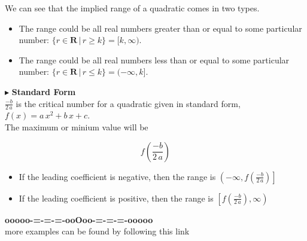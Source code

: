 \documentclass{ximera}
\begin{document}
We can see that the implied range of a quadratic comes in two types.  

\begin{itemize}
\item The range could be all real numbers greater than or equal to some particular number:  $\{ r \in \textbf{R} \, | \, r \geq k \} = [k, \infty)$.
\item The range could be all real numbers less than or equal to some particular number:  $\{ r \in \textbf{R} \, | \, r \leq k \} = (-\infty, k]$.
\end{itemize}






$\blacktriangleright$  \textbf{Standard Form} \\

$\frac{-b}{2 \, a}$ is the critical number for a quadratic given in standard form, $f(x) = a \, x^2 + b \, x + c$. \\

The maximum or minium value will be 

\[
f\left( \frac{-b}{2 \, a} \right)
\]

\begin{itemize}
     \item If the leading coefficient is negative, then the range is $\left(-\infty, f\left( \frac{-b}{2 \, a} \right)\right]$ \\
     \item If the leading coefficient is positive, then the range is $\left[f\left( \frac{-b}{2 \, a} \right), \infty \right)$ \\
\end{itemize}







\begin{center}
\textbf{\textcolor{green!50!black}{ooooo-=-=-=-ooOoo-=-=-=-ooooo}} \\

more examples can be found by following this link\\ 

\end{center}
\end{document}
